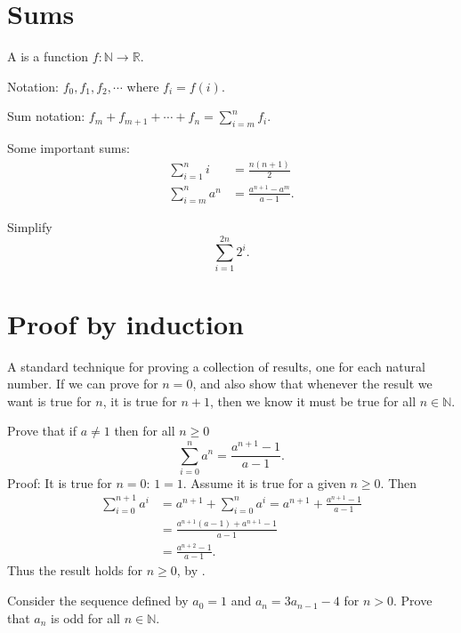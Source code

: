 \section{Sums}

A  is a function $f:\mathbb{N} \to \mathbb{R}$. 

Notation: $f_0, f_1, f_2, \cdots$ where $f_i = f(i)$.

Sum notation: $f_m+f_{m+1}+\cdots +f_n = \sum_{i=m}^n f_i$.

Some important sums: 
\begin{align*}
\sum_{i=1}^n i & = \frac{n(n+1)}{2} \\
\sum_{i=m}^n a^n&  = \frac{a^{n+1}-a^m}{a-1}.
\end{align*}

\begin{Boxample}[4]
Simplify 
$$
\sum_{i=1}^{2n} 2^i.
$$
\end{Boxample}

\section{Proof by induction}
A standard technique for proving a collection of results, one for each natural number. If we can prove for $n=0$, and also show that whenever the result we want is true for $n$, it is true for $n+1$, then we know it must be true for all $n\in \mathbb{N}$.

\begin{Example}
Prove that if $a\neq 1$ then for all  $n\geq 0$
$$
\sum_{i=0}^n a^n = \frac{a^{n+1} - 1}{a - 1}.
$$
Proof: It is true for $n=0$: $1 = 1$. Assume it is true for a given  $n\geq 0$. Then
\begin{align*}
\sum_{i=0}^{n+1} a^i & = a^{n+1} + \sum_{i=0}^n a^i 
= a^{n+1} + \frac{a^{n+1} - 1}{a-1} \\
& = \frac{a^{n+1} (a - 1) + a^{n+1} - 1}{a-1}\\
& = \frac{a^{n+2} - 1}{a-1}.
\end{align*}
Thus the result holds for  $n\geq 0$, by .
\end{Example}

\begin{Boxample}[4]
Consider the sequence defined by $a_0 = 1$ and $a_n = 3a_{n-1} - 4$ for $n>0$. Prove that $a_n$ is odd for all $n\in \mathbb{N}$.

\end{Boxample}

